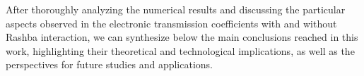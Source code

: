 After thoroughly analyzing the numerical results and discussing the particular aspects observed in the electronic transmission coefficients with and without Rashba interaction, we can synthesize below the main conclusions reached in this work, highlighting their theoretical and technological implications, as well as the perspectives for future studies and applications.
